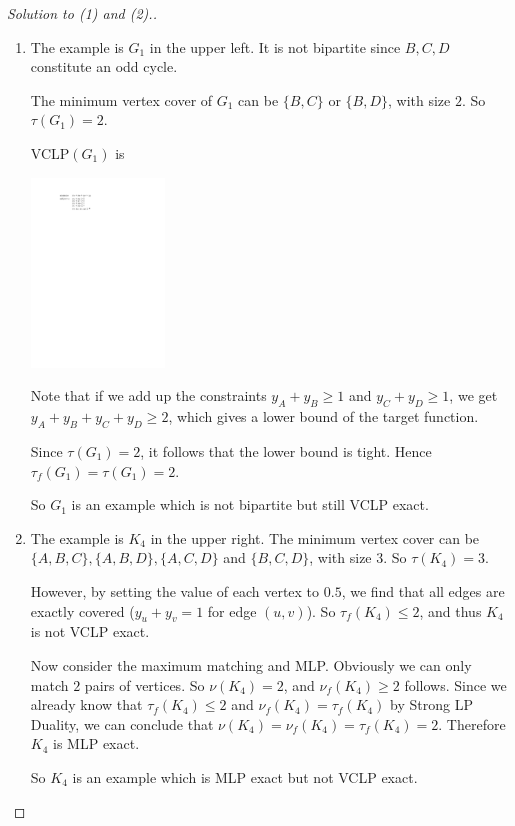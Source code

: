     \begin{proof}[Solution to (1) and (2).]
        ~
        \begin{enumerate}
            \item The example is $G_1$ in the upper left. It is not bipartite since $B, C, D$ constitute an odd cycle.
            
            The minimum vertex cover of $G_1$ can be $\{B, C\}$ or $\{B, D\}$, with size $2$. So $\tau(G_1) = 2$.
            
            VCLP$(G_1)$ is
            \begin{center}
                \includegraphics[width=0.28\textwidth]{VCLP4_1.pdf}
            \end{center}
            Note that if we add up the constraints $y_A + y_B \geq 1$ and $y_C + y_D \geq 1$, we get $y_A + y_B + y_C + y_D \geq 2$, which gives a lower bound of the target function.
            
            Since $\tau(G_1) = 2$, it follows that the lower bound is tight. Hence $\tau_f(G_1) = \tau(G_1) = 2$.
            
            So $G_1$ is an example which is not bipartite but still VCLP exact.
            
            \item The example is $K_4$ in the upper right. The minimum vertex cover can be $\{A, B, C\}, \{A, B, D\}, \{A, C, D\}$ and $\{B, C, D\}$, with size $3$. So $\tau(K_4) = 3$.
            
            However, by setting the value of each vertex to $0.5$, we find that all edges are exactly covered ($y_u + y_v = 1$ for edge $(u, v)$). So $\tau_f(K_4) \leq 2$, and thus $K_4$ is not VCLP exact.
            
            Now consider the maximum matching and MLP. Obviously we can only match $2$ pairs of vertices. So $\nu(K_4) = 2$, and $\nu_f(K_4) \geq 2$ follows. Since we already know that $\tau_f(K_4) \leq 2$ and $\nu_f(K_4) = \tau_f(K_4)$ by Strong LP Duality, we can conclude that $\nu(K_4) = \nu_f(K_4) = \tau_f(K_4) = 2$. Therefore $K_4$ is MLP exact.
            
            So $K_4$ is an example which is MLP exact but not VCLP exact.
        \end{enumerate}
    \end{proof}

